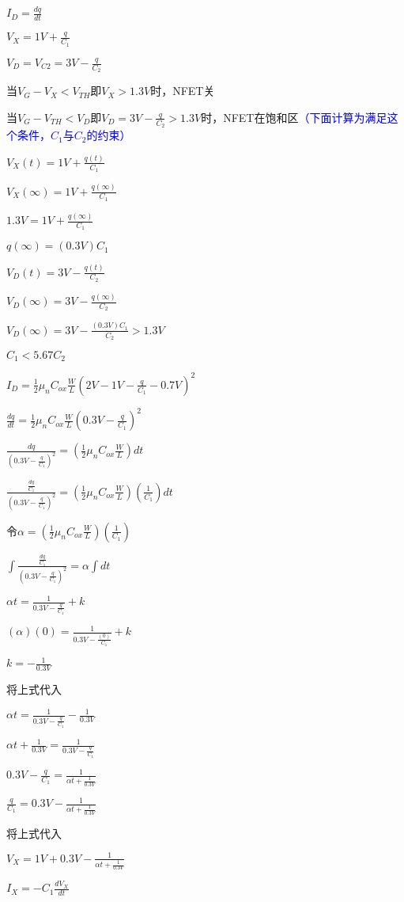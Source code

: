 $I_D=\frac{dq}{dt}$

$V_X=1V+\frac{q}{C_1}$

$V_D=V_{C2}=3V-\frac{q}{C_2}$

当$V_G-V_X<V_{TH}$即$V_X>1.3V$时，NFET关

当$V_G-V_{TH}<V_D$即$V_D=3V-\frac{q}{C_2}>1.3V$时，NFET在饱和区\textcolor{blue}{（下面计算为满足这个条件，$C_1$与$C_2$的约束）}

$V_X(t)=1V+\frac{q(t)}{C_1}$

$V_X(\infty)=1V+\frac{q(\infty)}{C_1}$

$1.3V=1V+\frac{q(\infty)}{C_1}$

$q(\infty)=(0.3V)C_1$

$V_D(t)=3V-\frac{q(t)}{C_2}$

$V_D(\infty)=3V-\frac{q(\infty)}{C_2}$

$V_D(\infty)=3V-\frac{(0.3V)C_1}{C_2}>1.3V$

$C_1<5.67C_2$

$I_D=\frac{1}{2}\mu_nC_{ox}\frac{W}{L}(2V-1V-\frac{q}{C_1}-0.7V)^2$

$\frac{dq}{dt}=\frac{1}{2}\mu_nC_{ox}\frac{W}{L}(0.3V-\frac{q}{C_1})^2$

$\frac{dq}{(0.3V-\frac{q}{C_1})^2}=(\frac{1}{2}\mu_nC_{ox}\frac{W}{L})dt$

$\frac{\frac{dq}{C_1}}{(0.3V-\frac{q}{C_1})^2}=(\frac{1}{2}\mu_nC_{ox}\frac{W}{L})(\frac{1}{C_1})dt$

令$\alpha=(\frac{1}{2}\mu_nC_{ox}\frac{W}{L})(\frac{1}{C_1})$

$\int \frac{\frac{dq}{C_1}}{(0.3V-\frac{q}{C_1})^2}=\alpha \int dt$

$\alpha t=\frac{1}{0.3V-\frac{q}{C_1}}+k$

$(\alpha) (0)=\frac{1}{0.3V-\frac{(0)}{C_1}}+k$

$k=-\frac{1}{0.3V}$

将上式代入

$\alpha t=\frac{1}{0.3V-\frac{q}{C_1}}-\frac{1}{0.3V}$

$\alpha t+\frac{1}{0.3V}=\frac{1}{0.3V-\frac{q}{C_1}}$

$0.3V-\frac{q}{C_1}=\frac{1}{\alpha t+\frac{1}{0.3V}}$

$\frac{q}{C_1}=0.3V-\frac{1}{\alpha t+\frac{1}{0.3V}}$

将上式代入

$V_X=1V+0.3V-\frac{1}{\alpha t+\frac{1}{0.3V}}$

$I_X=-C_1\frac{dV_X}{dt}$


